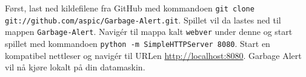 Først, last ned kildefilene fra GitHub med kommandoen \newline\texttt{git clone git://github.com/aspic/Garbage-Alert.git}. Spillet vil da lastes ned til mappen \texttt{Garbage-Alert}. Navigér til mappa kalt \texttt{webver} under denne  og start spillet med kommandoen \texttt{python -m SimpleHTTPServer 8080}. Start en kompatibel nettleser og navigér til URLen \url{http://localhost:8080}. Garbage Alert vil nå kjøre lokalt på din datamaskin.
